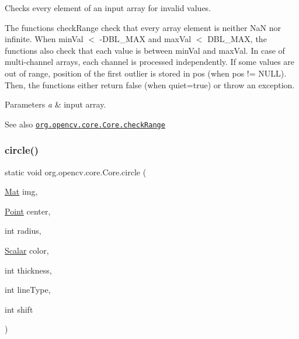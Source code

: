 Checks every element of an input array for invalid values.

The functions {\ttfamily check\+Range} check that every array element is neither NaN nor infinite. When {\ttfamily min\+Val $<$ -\/\+D\+B\+L\+\_\+\+M\+AX} and {\ttfamily max\+Val $<$ D\+B\+L\+\_\+\+M\+AX}, the functions also check that each value is between {\ttfamily min\+Val} and {\ttfamily max\+Val}. In case of multi-\/channel arrays, each channel is processed independently. If some values are out of range, position of the first outlier is stored in {\ttfamily pos} (when {\ttfamily pos != N\+U\+LL}). Then, the functions either return false (when {\ttfamily quiet=true}) or throw an exception.


\begin{DoxyParams}{Parameters}
{\em a} & input array.\\
\hline
\end{DoxyParams}
\begin{DoxySeeAlso}{See also}
\href{http://docs.opencv.org/modules/core/doc/operations_on_arrays.html#checkrange}{\tt org.\+opencv.\+core.\+Core.\+check\+Range} 
\end{DoxySeeAlso}
\mbox{\label{classorg_1_1opencv_1_1core_1_1_core_aa0f688f66d937f5952cb9f1db6f43326}} 
\subsubsection{\texorpdfstring{circle()}{circle()}\hspace{0.1cm}{\footnotesize\ttfamily [1/3]}}
{\footnotesize\ttfamily static void org.\+opencv.\+core.\+Core.\+circle (\begin{DoxyParamCaption}\item[{\mbox{\hyperlink{classorg_1_1opencv_1_1core_1_1_mat}{Mat}}}]{img,  }\item[{\mbox{\hyperlink{classorg_1_1opencv_1_1core_1_1_point}{Point}}}]{center,  }\item[{int}]{radius,  }\item[{\mbox{\hyperlink{classorg_1_1opencv_1_1core_1_1_scalar}{Scalar}}}]{color,  }\item[{int}]{thickness,  }\item[{int}]{line\+Type,  }\item[{int}]{shift }\end{DoxyParamCaption})\hspace{0.3cm}{\ttfamily [static]}}

